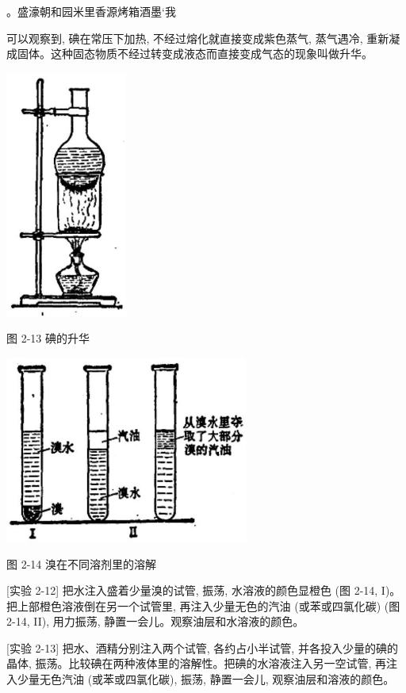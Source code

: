 \documentclass[10pt]{article}
\begin{document}
。盛濠朝和园米里香源烤箱酒墨‘我

可以观察到, 碘在常压下加热, 不经过熔化就直接变成紫色蒸气, 蒸气遇冷, 重新凝成固体。这种固态物质不经过转变成液态而直接变成气态的现象叫做升华。

\begin{center}
\includegraphics[max width=0.3\textwidth]{images/01912d0f-097c-7e75-8f32-4f326cd86c9f_49_731413.jpg}
\end{center}

图 2-13 碘的升华

\begin{center}
\includegraphics[max width=0.6\textwidth]{images/01912d0f-097c-7e75-8f32-4f326cd86c9f_49_749414.jpg}
\end{center}

图 2-14 溴在不同溶剂里的溶解

[实验 2-12] 把水注入盛着少量溴的试管, 振荡, 水溶液的颜色显橙色 (图 2-14, I)。把上部橙色溶液倒在另一个试管里, 再注入少量无色的汽油 (或苯或四氯化碳) (图 2-14, II), 用力振荡, 静置一会儿。观察油层和水溶液的颜色。

[实验 2-13] 把水、酒精分别注入两个试管, 各约占小半试管, 并各投入少量的碘的晶体, 振荡。比较碘在两种液体里的溶解性。把碘的水溶液注入另一空试管, 再注入少量无色汽油 (或苯或四氯化碳), 振荡, 静置一会儿, 观察油层和溶液的颜色。
\end{document}
